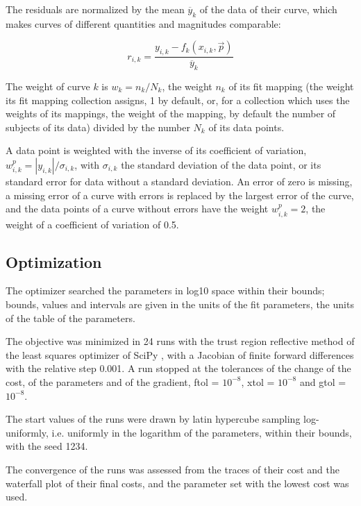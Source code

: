 The residuals are normalized by the mean $\overline{y}_k$ of the data of their curve, which makes curves of different quantities and magnitudes comparable:

\begin{equation}
r_{i,k} = \frac{y_{i,k} - f_k(x_{i,k}, \vec{p})}{\overline{y}_k}
\end{equation}

The weight of curve $k$ is $w_k = n_k / N_k$, the weight $n_k$ of its fit mapping (the weight its fit mapping collection assigns, 1 by default, or, for a collection which uses the weights of its mappings, the weight of the mapping, by default the number of subjects of its data) divided by the number $N_k$ of its data points.

A data point is weighted with the inverse of its coefficient of variation, $w^{p}_{i,k} = |y_{i,k}| / \sigma_{i,k}$, with $\sigma_{i,k}$ the standard deviation of the data point, or its standard error for data without a standard deviation. An error of zero is missing, a missing error of a curve with errors is replaced by the largest error of the curve, and the data points of a curve without errors have the weight $w^{p}_{i,k} = 2$, the weight of a coefficient of variation of 0.5.

\subsection{Optimization}

The optimizer searched the parameters in log10 space within their bounds; bounds, values and intervals are given in the units of the fit parameters, the units of the table of the parameters.

The objective was minimized in 24 runs with the trust region reflective method \cite{Branch1999} of the least squares optimizer of SciPy \cite{Virtanen2020}, with a Jacobian of finite forward differences with the relative step 0.001. A run stopped at the tolerances of the change of the cost, of the parameters and of the gradient, ftol = $10^{-8}$, xtol = $10^{-8}$ and gtol = $10^{-8}$.

The start values of the runs were drawn by latin hypercube sampling \cite{McKay1979} log-uniformly, i.e. uniformly in the logarithm of the parameters, within their bounds, with the seed 1234.

The convergence of the runs was assessed from the traces of their cost and the waterfall plot of their final costs, and the parameter set with the lowest cost was used.

